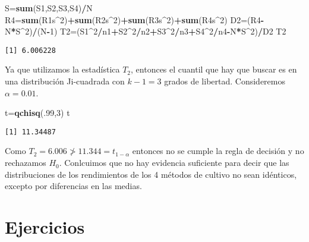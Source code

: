 \documentclass[a4paper,oneside,openany]{book}
\newenvironment{Shaded}{\begin{snugshade}}{\end{snugshade}}
\newcommand{\KeywordTok}[1]{\textcolor[rgb]{0.13,0.29,0.53}{\textbf{#1}}}
\newcommand{\DecValTok}[1]{\textcolor[rgb]{0.00,0.00,0.81}{#1}}
\newcommand{\OperatorTok}[1]{\textcolor[rgb]{0.81,0.36,0.00}{\textbf{#1}}}
\newcommand{\NormalTok}[1]{#1}
\begin{document}
\begin{Shaded}
\begin{Highlighting}[]
\NormalTok{S=}\KeywordTok{sum}\NormalTok{(S1,S2,S3,S4)}\OperatorTok{/}\NormalTok{N}
\NormalTok{R4=}\KeywordTok{sum}\NormalTok{(R1s}\OperatorTok{^}\DecValTok{2}\NormalTok{)}\OperatorTok{+}\KeywordTok{sum}\NormalTok{(R2s}\OperatorTok{^}\DecValTok{2}\NormalTok{)}\OperatorTok{+}\KeywordTok{sum}\NormalTok{(R3s}\OperatorTok{^}\DecValTok{2}\NormalTok{)}\OperatorTok{+}\KeywordTok{sum}\NormalTok{(R4s}\OperatorTok{^}\DecValTok{2}\NormalTok{)}
\NormalTok{D2=(R4}\OperatorTok{-}\NormalTok{N}\OperatorTok{*}\NormalTok{S}\OperatorTok{^}\DecValTok{2}\NormalTok{)}\OperatorTok{/}\NormalTok{(N}\OperatorTok{-}\DecValTok{1}\NormalTok{)}
\NormalTok{T2=(S1}\OperatorTok{^}\DecValTok{2}\OperatorTok{/}\NormalTok{n1}\OperatorTok{+}\NormalTok{S2}\OperatorTok{^}\DecValTok{2}\OperatorTok{/}\NormalTok{n2}\OperatorTok{+}\NormalTok{S3}\OperatorTok{^}\DecValTok{2}\OperatorTok{/}\NormalTok{n3}\OperatorTok{+}\NormalTok{S4}\OperatorTok{^}\DecValTok{2}\OperatorTok{/}\NormalTok{n4}\OperatorTok{-}\NormalTok{N}\OperatorTok{*}\NormalTok{S}\OperatorTok{^}\DecValTok{2}\NormalTok{)}\OperatorTok{/}\NormalTok{D2}
\NormalTok{T2}
\end{Highlighting}
\end{Shaded}

\begin{verbatim}
[1] 6.006228
\end{verbatim}

Ya que utilizamos la estadística \(T_2\), entonces el cuantil que hay
que buscar es en una distribución Ji-cuadrada con \(k-1=3\) grados de
libertad. Consideremos \(\alpha=0.01\).

\begin{Shaded}
\begin{Highlighting}[]
\NormalTok{t=}\KeywordTok{qchisq}\NormalTok{(.}\DecValTok{99}\NormalTok{,}\DecValTok{3}\NormalTok{)}
\NormalTok{t}
\end{Highlighting}
\end{Shaded}

\begin{verbatim}
[1] 11.34487
\end{verbatim}

Como \(T_2=6.006\ngtr11.344=t_{1-\alpha}\) entonces no se cumple la
regla de decisión y no rechazamos \(H_0\). Conlcuimos que no hay
evidencia suficiente para decir que las distribuciones de los
rendimientos de los 4 métodos de cultivo no sean idénticos, excepto por
diferencias en las medias.

\section{Ejercicios}\label{ejercicios-8}
\end{document}
